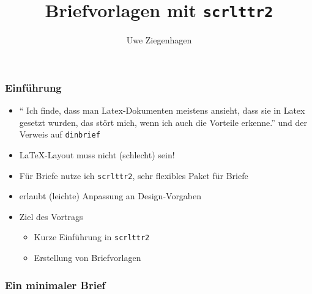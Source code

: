 \documentclass[12pt,ngerman]{beamer}
\author{Uwe Ziegenhagen}
\title{Briefvorlagen mit \texttt{scrlttr2}}
\begin{document}
\begin{frame}

\maketitle

\end{frame}

\begin{frame}
\frametitle{Einführung}

\begin{itemize}
\item \enquote{ Ich finde, dass man Latex-Dokumenten meistens ansieht, dass sie in Latex gesetzt wurden, das stört mich, wenn ich auch die Vorteile erkenne.} und der Verweis auf \texttt{dinbrief}
\item \LaTeX-Layout muss nicht (schlecht) sein!
\item Für Briefe nutze ich \texttt{scrlttr2}, sehr flexibles Paket für Briefe
\item erlaubt (leichte) Anpassung an Design-Vorgaben
\item Ziel des Vortrags

\begin{itemize}
	\item Kurze Einführung in \texttt{scrlttr2}
	\item Erstellung von Briefvorlagen
\end{itemize}


\end{itemize}
\end{frame}

\begin{frame}[fragile]
\frametitle{Ein minimaler Brief}



\end{frame}
\end{document}
